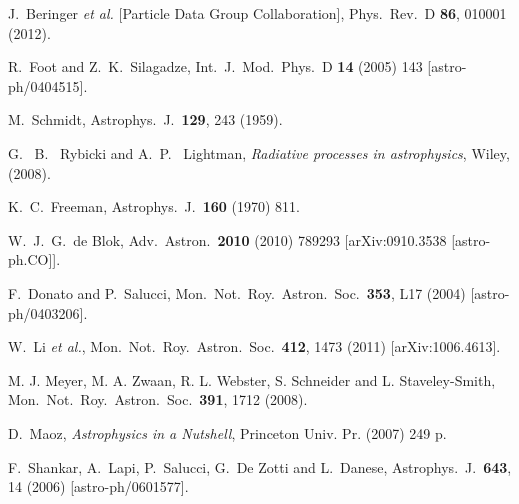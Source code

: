 \documentclass[12pt]{article}
\begin{document}
{{\begin{thebibliography}{999}
  J.~Beringer {\it et al.}  [Particle Data Group Collaboration],
  Phys.\ Rev.\ D {\bf 86}, 010001 (2012).
  
  R.~Foot and Z.~K.~Silagadze,
  Int.\ J.\ Mod.\ Phys.\ D {\bf 14} (2005) 143
  [astro-ph/0404515].

  M.~Schmidt,
  Astrophys.\ J.\  {\bf 129}, 243 (1959).
  
 
 G. ~B. ~Rybicki and A.~P. ~Lightman,
 {\it Radiative processes in astrophysics},
 Wiley, (2008).
 
  K.~C.~Freeman,
  Astrophys.\ J.\  {\bf 160} (1970) 811.

  W.~J.~G.~de Blok,
  Adv.\ Astron.\  {\bf 2010} (2010) 789293
  [arXiv:0910.3538 [astro-ph.CO]].
  
 F.~Donato and P.~Salucci,
 Mon.\ Not.\ Roy.\ Astron.\ Soc.\  {\bf 353}, L17 (2004) [astro-ph/0403206].
 
W.~Li {\it et al.}, 
Mon.\ Not.\ Roy.\ Astron.\ Soc.\  {\bf 412}, 1473 (2011) [arXiv:1006.4613].
  
 M. J. Meyer, M. A. Zwaan, R. L. Webster, S. Schneider and L. Staveley-Smith,
 Mon.\ Not.\ Roy.\ Astron.\ Soc.\  {\bf 391}, 1712 (2008).
 
  D.~Maoz,
  {\it Astrophysics in a Nutshell},
  Princeton Univ. Pr. (2007) 249 p.

 F.~Shankar, A.~Lapi, P.~Salucci, G.~De Zotti and L.~Danese,
 Astrophys.\ J.\  {\bf 643}, 14 (2006)
 [astro-ph/0601577].


\end{thebibliography}}}
\end{document}
